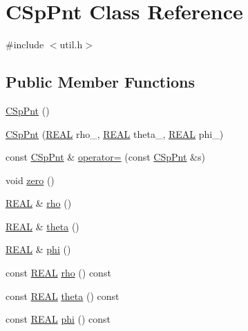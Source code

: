 \hypertarget{classCSpPnt}{\section{C\-Sp\-Pnt Class Reference}
\label{classCSpPnt}
}


{\ttfamily \#include $<$util.\-h$>$}

\subsection*{Public Member Functions}
\begin{DoxyCompactItemize}
\item 
\hyperlink{classCSpPnt_ab2366cfde717accefce56fc72aa5a2ed}{C\-Sp\-Pnt} ()
\item 
\hyperlink{classCSpPnt_a2d035000bbff43189d79affc0447a9a3}{C\-Sp\-Pnt} (\hyperlink{util_8h_a5821460e95a0800cf9f24c38915cbbde}{R\-E\-A\-L} rho\-\_\-, \hyperlink{util_8h_a5821460e95a0800cf9f24c38915cbbde}{R\-E\-A\-L} theta\-\_\-, \hyperlink{util_8h_a5821460e95a0800cf9f24c38915cbbde}{R\-E\-A\-L} phi\-\_\-)
\item 
const \hyperlink{classCSpPnt}{C\-Sp\-Pnt} \& \hyperlink{classCSpPnt_aee31a3b97c734fa150f1a33daadd6dfc}{operator=} (const \hyperlink{classCSpPnt}{C\-Sp\-Pnt} \&s)
\item 
void \hyperlink{classCSpPnt_a9525366e1c144421d07c0a1485256f82}{zero} ()
\item 
\hyperlink{util_8h_a5821460e95a0800cf9f24c38915cbbde}{R\-E\-A\-L} \& \hyperlink{classCSpPnt_af6364f003b923aa77c880869d27caa64}{rho} ()
\item 
\hyperlink{util_8h_a5821460e95a0800cf9f24c38915cbbde}{R\-E\-A\-L} \& \hyperlink{classCSpPnt_a4b48e7760135fc768ab6911a328194ba}{theta} ()
\item 
\hyperlink{util_8h_a5821460e95a0800cf9f24c38915cbbde}{R\-E\-A\-L} \& \hyperlink{classCSpPnt_af4f411d4a656dfec7c5a69ba065dbe1d}{phi} ()
\item 
const \hyperlink{util_8h_a5821460e95a0800cf9f24c38915cbbde}{R\-E\-A\-L} \hyperlink{classCSpPnt_ad7366f49f0fde0b19a3682ace6b606ba}{rho} () const 
\item 
const \hyperlink{util_8h_a5821460e95a0800cf9f24c38915cbbde}{R\-E\-A\-L} \hyperlink{classCSpPnt_aed72be0c307a800a1b7565ba80d87e1f}{theta} () const 
\item 
const \hyperlink{util_8h_a5821460e95a0800cf9f24c38915cbbde}{R\-E\-A\-L} \hyperlink{classCSpPnt_a4ecdc3162c71e20aed001b40a497a339}{phi} () const 
\end{DoxyCompactItemize}
